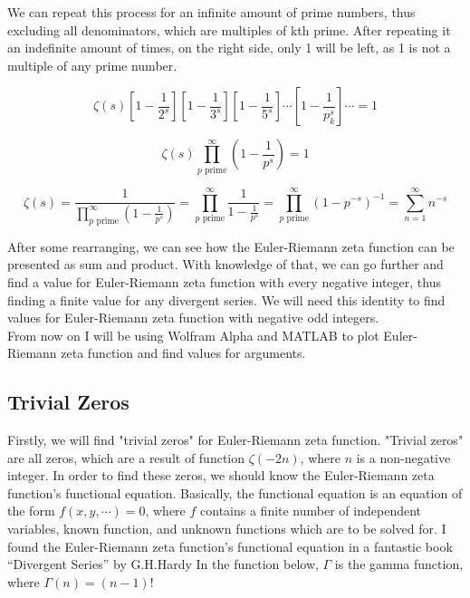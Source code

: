 \documentclass[a4paper]{article}
\begin{document}
We can repeat this process for an infinite amount of prime numbers, thus
excluding all denominators, which are multiples of kth prime. After repeating it
an indefinite amount of times, on the right side, only 1 will be left, as 1 is
not a multiple of any prime number. 

\begin{equation*}
  \zeta(s)[1-\frac{1}{2^s}][1-\frac{1}{3^s}][1-\frac{1}{5^s}]\cdots[1-\frac{1}{p_k^s}]\cdots=1
  \end{equation*}

\begin{equation*}
    \zeta(s)\prod_{p \text{ prime}}^{\infty} (1-\frac{1}{p^s})=1
\end{equation*}

\begin{equation*}
  \zeta(s)=\frac{1}{\prod_{p \text{ prime}}^{\infty} (1-\frac{1}{p^s})}=\prod_{p \text{ prime}}^{\infty} \frac{1}{1-\frac{1}{p^s}}=
  \prod_{p \text{ prime}}^{\infty} (1-p^{-s})^{-1}=\sum_{n=1}^{\infty} n^{-s}
  \end{equation*}

After some rearranging, we can see how the Euler-Riemann zeta function can be
presented as sum and product. With knowledge of that, we can go further and find
a value for Euler-Riemann zeta function with every negative integer, thus
finding a finite value for any divergent series. We will need this identity to
find values for Euler-Riemann zeta function with negative odd integers.\\

From now on I will be using Wolfram Alpha and MATLAB to plot Euler-Riemann zeta
function and find values for arguments.\\

\subsection{Trivial Zeros}
\label{sec-5-2}

Firstly, we will find "trivial zeros" for Euler-Riemann zeta function. "Trivial
zeros" are all zeros, which are a result of function $\zeta(-2n)$, where $n$ is
a non-negative integer. In order to find these zeros, we should know the
Euler-Riemann zeta function's functional equation. Basically, the functional
equation \cite{Func} is an equation of the form $f(x, y, \cdots ) = 0$, where $f$
contains a finite number of independent variables, known function, and unknown
functions which are to be solved for. I found the Euler-Riemann zeta function's
functional equation in a fantastic book “Divergent Series” by
G.H.Hardy \cite{Hardy} In the function below, $\Gamma$ is the gamma function,
where $\Gamma(n) = (n-1)!$ 
\end{document}
